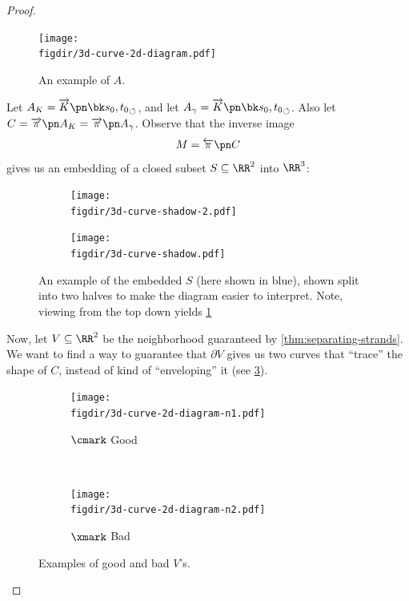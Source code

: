 \begin{proof}
  \begin{figure}[H]
    \centering
    \texttt{[image: \\figdir/3d-curve-2d-diagram.pdf]}
    \caption[Example 2D Diagram]{An example of $A$.}
    \label{fig:example-2d-projection}
  \end{figure}
  Let $A_K = \fim{K}{\sbk{s_0, t_0}}$, and let $A_\gamma =
  \fim{K}{\sbk{s_0, t_0}}$. Also let $C = \fim{\pi}{A_K} =
  \fim{\pi}{A_\gamma}$. Observe that the inverse image
  \[
    M = \fpre{\pi}{C}
  \]
  gives us an embedding of a closed subset $S \subseteq \RR^2$ into
  $\RR^3$:
  \begin{figure}[H]
    \centering
    \begin{subfigure}[t]{.5\linewidth}
      \centering
      \texttt{[image: \\figdir/3d-curve-shadow-2.pdf]}
    \end{subfigure}
    \begin{subfigure}[t]{.5\linewidth}
      \centering
      \texttt{[image: \\figdir/3d-curve-shadow.pdf]}
    \end{subfigure}
    \caption[Example Associated 2-manifold]{An example of the embedded
      $S$ (here shown in {\color{blue} blue}), shown split into two
      halves to make the diagram easier to interpret. Note, viewing
      from the top down yields \cref{fig:example-2d-projection}}
    \label{fig:example-2-manifold}
  \end{figure}
  Now, let $V \subseteq \RR^2$ be the neighborhood guaranteed by
  \cref{thm:separating-strands}. We want to find a way to guarantee
  that $\partial V$ gives us two curves that ``trace'' the shape of
  $C$, instead of kind of ``enveloping'' it (see
  \cref{fig:examples-of-neighborhoods}).
  \begin{figure}[H]
    \centering
    \begin{subfigure}[t]{.5\linewidth}
      \centering
      \texttt{[image: \\figdir/3d-curve-2d-diagram-n1.pdf]}
      \caption{$\cmark$ Good}
    \end{subfigure}~
    \begin{subfigure}[t]{.5\linewidth}
      \centering
      \texttt{[image: \\figdir/3d-curve-2d-diagram-n2.pdf]}
      \caption{$\xmark$ Bad}
    \end{subfigure}
    \caption{Examples of good and bad $V$'s.}
    \label{fig:examples-of-neighborhoods}

\end{figure}
\end{proof}
